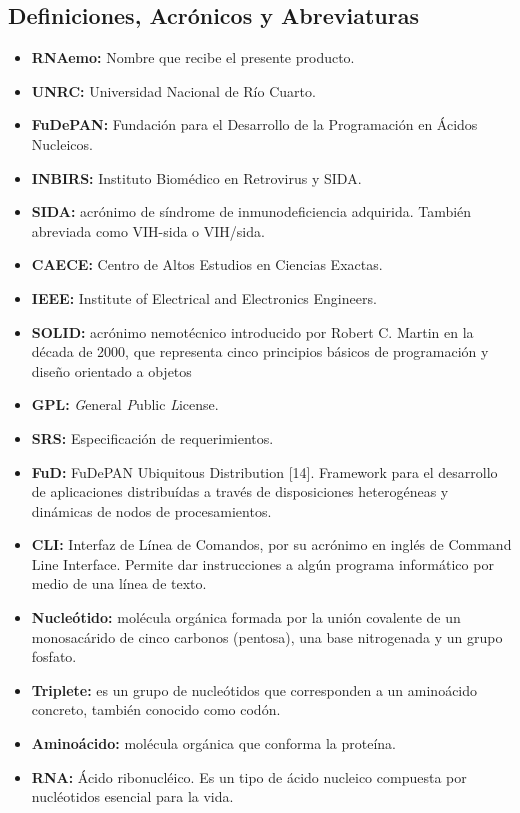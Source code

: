\documentclass[12pt,a4paper,english,spanish]{article}
\begin{document}
\subsection{Definiciones, Acrónicos y Abreviaturas}
\begin{itemize}
	\item \textbf{RNAemo:} Nombre que recibe el presente producto.
	\item \textbf{UNRC:} Universidad Nacional de Río Cuarto.
	\item \textbf{FuDePAN:} Fundación para el Desarrollo de la Programación en Ácidos Nucleicos.
	\item \textbf{INBIRS:} Instituto Biomédico en Retrovirus y SIDA.
	\item \textbf{SIDA:} acrónimo de síndrome de inmunodeficiencia adquirida. También abreviada como VIH-sida o VIH/sida.
	\item \textbf{CAECE:} Centro de Altos Estudios en Ciencias Exactas.
	\item \textbf{IEEE:} Institute of Electrical and Electronics Engineers.
	\item \textbf{SOLID:} acrónimo nemotécnico introducido por Robert C. Martin en la
							década de 2000, que representa cinco principios básicos de programación
							y diseño orientado a objetos
	\item \textbf{GPL:} \textit{G}eneral \textit{P}ublic \textit{L}icense.	
	\item \textbf{SRS:} Especificación de requerimientos.
	\item \textbf{FuD:} FuDePAN Ubiquitous Distribution [14]. Framework para el desarrollo de aplicaciones distribuídas a través de disposiciones 							heterogéneas y dinámicas de nodos de procesamientos.
	\item \textbf{CLI:} Interfaz de Línea de Comandos, por su acrónimo en inglés de Command Line Interface. Permite dar instrucciones a algún programa 							informático por medio de una línea de texto.
	\item \textbf{Nucleótido:} molécula orgánica formada por la unión covalente de un monosacárido de cinco carbonos (pentosa), una base nitrogenada y un 								   grupo fosfato.
	\item \textbf{Triplete:} es un grupo de nucleótidos que corresponden a un aminoácido concreto, también conocido como codón.
	\item \textbf{Aminoácido:} molécula orgánica que conforma la proteína.
	\item \textbf{RNA:} Ácido ribonucléico. Es un tipo de ácido nucleico compuesta por nucléotidos esencial para la vida.

\end{itemize}
\end{document}
